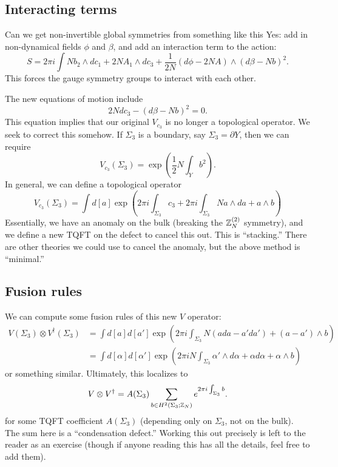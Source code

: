 \subsection{Interacting terms}

Can we get non-invertible global symmetries from something like this
Yes: add in non-dynamical fields $\phi$ and $\beta$, and add an interaction term to the action:
\[
	S = 2 \pi i \int N b_2 \wedge dc_1 + 2N A_1 \wedge dc_3 + \frac{1}{2N} (d\phi - 2 N A) \wedge (d\beta - N b)^2.
\]
This forces the gauge symmetry groups to interact with each other.

The new equations of motion include
\[
	2N dc_3 - (d\beta - Nb)^2 = 0.
\]
This equation implies that our original $V_{c_3}$ is no longer a topological operator.
We seek to correct this somehow.
If $\Sigma_3$ is a boundary, say $\Sigma_3 = \partial Y$, then we can require
\[
	V_{c_3}(\Sigma_3) = \exp\left(\frac{1}{2} N \int_Y b^2\right).
\]
In general, we can define a topological operator
\[
	V_{c_3}(\Sigma_3) = \int d[a] \exp\left(2\pi i \int_{\Sigma_3} c_3 + 2\pi i \int_{\Sigma_3} N a \wedge da + a \wedge b\right)
\]
Essentially, we have an anomaly on the bulk (breaking the $\mathbb{Z}_N^{(2)}$ symmetry), and we define a new TQFT on the defect to cancel this out.
This is ``stacking.''
There are other theories we could use to cancel the anomaly, but the above method is ``minimal.''

\subsection{Fusion rules}

We can compute some fusion rules of this new $V$ operator:
\begin{align*}
	V(\Sigma_3) \otimes V^\dagger(\Sigma_3) &= \int d[a] d[a'] \exp\left(2\pi i \int_{\Sigma_3} N (a da - a' da') + (a - a') \wedge b\right) \\
						&= \int d[\alpha] d[\alpha'] \exp\left(2\pi i N \int_{\Sigma_3} \alpha' \wedge d\alpha + \alpha d\alpha + \alpha \wedge b\right)
\end{align*}
or something similar.
Ultimately, this localizes to 
\[
	V \otimes V^\dagger = A(\Sigma_3) \sum_{b \in H^2(\Sigma_3; \mathbb{Z}_N)} e^{2\pi i \int_{\Sigma_3} b}.
\]
for some TQFT coefficient $A(\Sigma_3)$ (depending only on $\Sigma_3$, not on the bulk).
The sum here is a ``condensation defect.''
Working this out precisely is left to the reader as an exercise (though if anyone reading this has all the details, feel free to add them).

